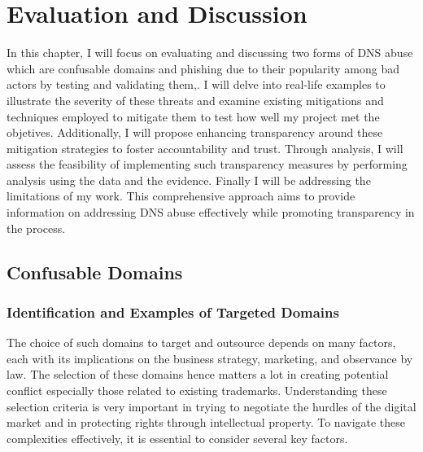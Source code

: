 \chapter{Evaluation and Discussion}

In this chapter, I will focus on evaluating and discussing two forms of DNS abuse which are confusable domains and phishing due to their popularity among bad actors by testing and validating them,. I will delve into real-life examples to illustrate the severity of these threats and examine existing mitigations and techniques employed to mitigate them to test how well my project met the objetives. Additionally, I will propose enhancing transparency around these mitigation strategies to foster accountability and trust. Through analysis, I will assess the feasibility of implementing such transparency measures by performing analysis using the data and the evidence. Finally I will be addressing the limitations of my work. This comprehensive approach aims to provide information on addressing DNS abuse effectively while promoting transparency in the process. 


\section{Confusable Domains}
\subsection{Identification and Examples of Targeted Domains}

The choice of such domains to target and outsource depends on many factors, each with its implications on the business strategy, marketing, and observance by law. The selection of these domains hence matters a lot in creating potential conflict especially those related to existing trademarks. Understanding these selection criteria is very important in trying to negotiate the hurdles of the digital market and in protecting rights through intellectual property. To navigate these complexities effectively, it is essential to consider several key factors. 

